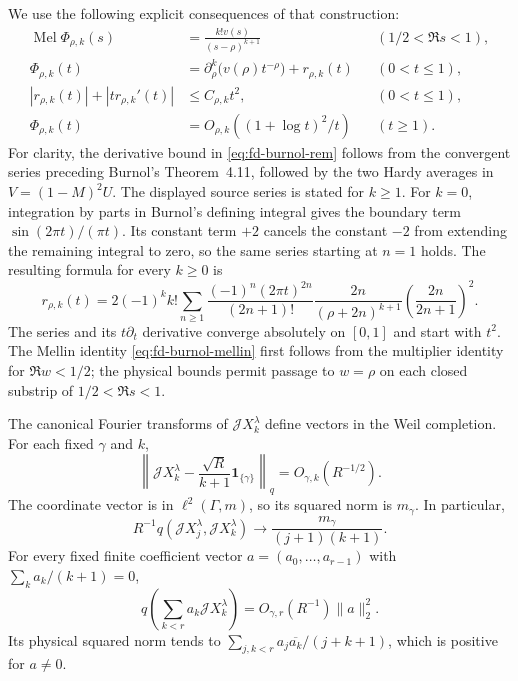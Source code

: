 We use the following explicit consequences of that construction:
\begin{align}
 \operatorname{Mel}\Phi_{\rho,k}(s)
  &=\frac{k!v(s)}{(s-\rho)^{k+1}}
               &&(1/2<\Re s<1),\label{eq:fd-burnol-mellin}\\
 \Phi_{\rho,k}(t)
  &=\partial_\rho^k\bigl(v(\rho)t^{-\rho}\bigr)
       +r_{\rho,k}(t)
               &&(0<t\le1),\label{eq:fd-burnol-small}\\
 |r_{\rho,k}(t)|+|t r_{\rho,k}'(t)|&\le C_{\rho,k}t^2,
               &&(0<t\le1),\label{eq:fd-burnol-rem}\\
 \Phi_{\rho,k}(t)&=O_{\rho,k}((1+\log t)^2/t)
               &&(t\ge1).\label{eq:fd-burnol-large}
\end{align}
For clarity, the derivative bound in
\eqref{eq:fd-burnol-rem} follows from the convergent series
preceding Burnol's Theorem~4.11, followed by the two Hardy averages
in \(V=(1-M)^2U\). The displayed source series is stated for
\(k\ge1\). For \(k=0\), integration by parts in Burnol's
defining integral gives the boundary term
\(\sin(2\pi t)/(\pi t)\). Its constant term \(+2\) cancels
the constant \(-2\) from extending the remaining integral to
zero, so the same series starting at \(n=1\) holds. The
resulting formula for every \(k\ge0\) is
\[
 r_{\rho,k}(t)=2(-1)^k k!\sum_{n\ge1}
 \frac{(-1)^n(2\pi t)^{2n}}{(2n+1)!}
 \frac{2n}{(\rho+2n)^{k+1}}
 \left(\frac{2n}{2n+1}\right)^2.
\]
The series and its \(t\partial_t\) derivative converge absolutely
on \([0,1]\) and start with \(t^2\). The Mellin identity
\eqref{eq:fd-burnol-mellin} first follows from the multiplier
identity for \(\Re w<1/2\); the physical bounds permit passage
to \(w=\rho\) on each closed substrip of \(1/2<\Re s<1\).

\begin{proposition}
\label{prop:fd-burnol-weil}
The canonical Fourier transforms of \(\mathcal JX_k^\lambda\)
define vectors in the Weil completion. For each fixed \(\gamma\)
and \(k\),
\begin{equation}\label{eq:fd-burnol-coordinate}
 \left\|\mathcal JX_k^\lambda
       -\frac{\sqrt R}{k+1}\mathbf1_{\{\gamma\}}\right\|_q
       =O_{\gamma,k}(R^{-1/2}).
\end{equation}
The coordinate vector is in \(\ell^2(\Gamma,m)\), so its squared
norm is \(m_\gamma\). In particular,
\begin{equation}\label{eq:fd-burnol-weil-gram}
 R^{-1}q(\mathcal JX_j^\lambda,\mathcal JX_k^\lambda)
 \longrightarrow\frac{m_\gamma}{(j+1)(k+1)}.
\end{equation}
For every fixed finite coefficient vector \(a=(a_0,\ldots,a_{r-1})\)
with \(\sum_k a_k/(k+1)=0\),
\[
 q\left(\sum_{k<r}a_k\mathcal JX_k^\lambda\right)
       =O_{\gamma,r}(R^{-1})\|a\|_2^2.
\]
Its physical squared norm tends to
\(\sum_{j,k<r}a_j\overline{a_k}/(j+k+1)\), which is positive
for \(a\ne0\).
\end{proposition}

